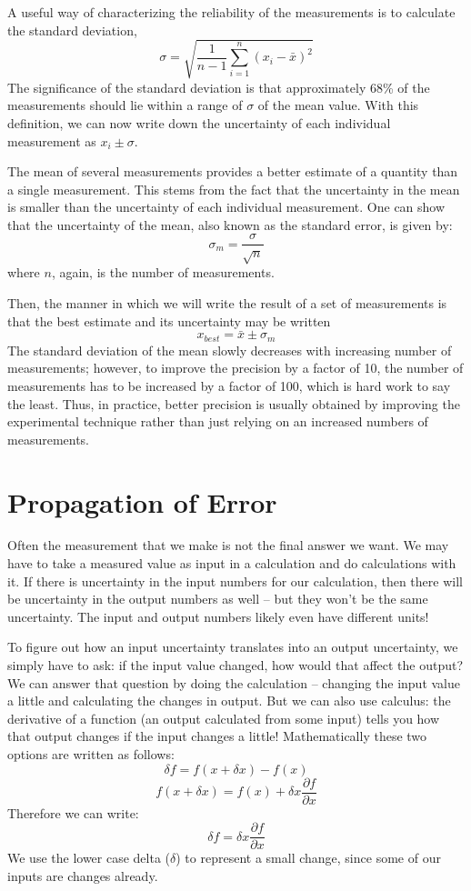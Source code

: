 A useful way of characterizing the reliability of the measurements is to calculate the standard deviation,
\[ \sigma = \sqrt{\frac{1}{n-1} \sum_{i=1}^{n}(x_{i}-\bar{x})^{2}} \]
The	significance of the standard deviation is that approximately 68\% of the measurements should lie within a range of $\sigma$ of the mean value.
With this definition, we can now write down the uncertainty of each individual measurement as $x_{i} \pm \sigma$.

The	mean of several measurements provides a better estimate of a quantity than a single measurement.
This stems from the fact that the uncertainty in the mean is smaller than the uncertainty of each individual measurement.
One can show that the uncertainty of the mean, also known as the standard error, is given by:
\[ \sigma_{m} = \frac{\sigma}{\sqrt{n}} \]
where $n$, again, is the number of measurements.

Then, the manner in which we will write the result of a set of measurements is that the best estimate and its uncertainty may be written
\[ x_{best} = \bar{x} \pm \sigma_{m} \]
The standard deviation of the mean slowly decreases with increasing number of  measurements; however, to improve the precision by a factor of 10, the number of measurements has to be increased by a factor of 100, which is hard work to say the least.
Thus, in practice, better precision is usually obtained by improving the experimental technique rather than just relying on an increased numbers of measurements.

\section*{Propagation of Error}
Often the measurement that we make is not the final answer we want. 
We may have to take a measured value as input in a calculation and do calculations with it. 
If there is uncertainty in the input numbers for our calculation, then there will be uncertainty in the output numbers as well – but they won't be the same uncertainty. 
The input and output numbers likely even have different units!
\par
To figure out how an input uncertainty translates into an output uncertainty, we simply have to ask: if the input value changed, how would that affect the output? 
We can answer that question by doing the calculation – changing the input value a little and calculating the changes in output. 
But we can also use calculus: the derivative of a function (an output calculated from some input) tells you how that output changes if the input changes a little! 
Mathematically these two options are written as follows:
\begin{equation}
\delta f = f(x + \delta x) - f(x)
\end{equation}
\begin{equation}
f(x + \delta x) = f(x) + \delta x \frac{\partial f}{\partial x}
\end{equation}
Therefore we can write:
\begin{equation}
\delta f = \delta x \frac{\partial f}{\partial x}
\end{equation}
We use the lower case delta ($\delta$) to represent a small change, since some of our inputs are changes already. 


